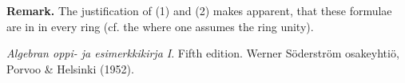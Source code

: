 \documentclass[12pt]{article}
\theoremstyle{definition}
\begin{document}
\textbf{Remark.}  The justification of (1) and (2) makes apparent, that these formulae are in  in every ring (cf. the  where one assumes the ring unity).

\begin{thebibliography}{9}
  {\em Algebran oppi- ja esimerkkikirja I}.  Fifth edition.  Werner S\"oderstr\"om osakeyhti\"o, Porvoo \& Helsinki (1952).
\end{thebibliography}


\end{document}
